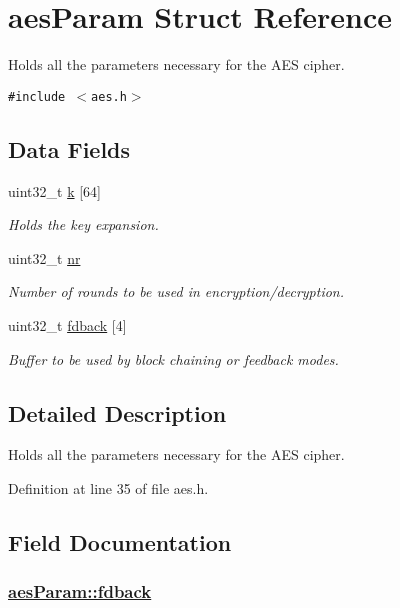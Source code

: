 \hypertarget{structaesParam}{
\section{aes\-Param Struct Reference}
\label{structaesParam}
}
Holds all the parameters necessary for the AES cipher.  


{\tt \#include $<$aes.h$>$}

\subsection*{Data Fields}
\begin{CompactItemize}
\item 
uint32\_\-t \hyperlink{structaesParam_o0}{k} \mbox{[}64\mbox{]}
\begin{CompactList}\small\item\em Holds the key expansion. \item\end{CompactList}\item 
uint32\_\-t \hyperlink{structaesParam_o1}{nr}
\begin{CompactList}\small\item\em Number of rounds to be used in encryption/decryption. \item\end{CompactList}\item 
uint32\_\-t \hyperlink{structaesParam_o2}{fdback} \mbox{[}4\mbox{]}
\begin{CompactList}\small\item\em Buffer to be used by block chaining or feedback modes. \item\end{CompactList}\end{CompactItemize}


\subsection{Detailed Description}
Holds all the parameters necessary for the AES cipher. 

Definition at line 35 of file aes.h.

\subsection{Field Documentation}
\hypertarget{structaesParam_o2}{
\subsubsection[fdback]{\setlength{\rightskip}{0pt plus 5cm}\hyperlink{structaesParam_o2}{aes\-Param::fdback}}}
\label{structaesParam_o2}


